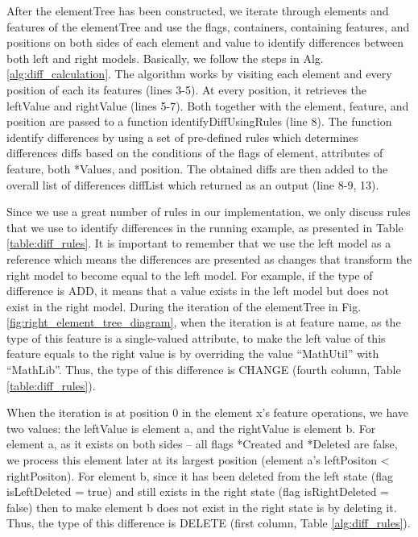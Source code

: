 \documentclass{jot}
\begin{document}
After the \textsf{elementTree} has been constructed, we iterate through elements and features of the \textsf{elementTree} and use the flags, containers, containing features, and positions on both sides of each element and value to identify differences between both left and right models. Basically, we follow the steps in Alg. \ref{alg:diff_calculation}. The algorithm works by visiting each element and every position of each its features (lines 3-5). At every position, it retrieves the \textsf{leftValue} and \textsf{rightValue} (lines 5-7).  Both together with the \textsf{element}, \textsf{feature}, and \textsf{position} are passed to a function \textsf{identifyDiffUsingRules} (line 8). The function identify differences by using a set of pre-defined rules which determines differences \textsf{diffs} based on the conditions of the flags of \textsf{element}, attributes of \textsf{feature}, both \textsf{*Values}, and \textsf{position}. The obtained \textsf{diffs} are then added to the overall list of differences \textsf{diffList} which returned as an output (line 8-9, 13). 

Since we use a great number of rules in our implementation, we only discuss rules that we use to identify differences in the running example, as presented in Table \ref{table:diff_rules}. It is important to remember that we use the left model as a reference which means the differences are presented as changes that transform the right model to become equal to the left model. For example, if the type of difference is \textsf{ADD}, it means that a value exists in the left model but does not exist in the right model. During the iteration of the \textsf{elementTree} in Fig. \ref{fig:right_element_tree_diagram}, when the iteration is at feature \textsf{name}, as the type of this feature is a single-valued attribute, to make the left value of this feature equals to the right value is by overriding the value ``MathUtil'' with ``MathLib''. Thus, the type of this difference is \textsf{CHANGE} (fourth column, Table \ref{table:diff_rules}).

When the iteration is at position 0 in the element \textsf{x}'s feature \textsf{operations}, we have two values: the \textsf{leftValue} is element \textsf{a}, and the \textsf{rightValue} is element \textsf{b}. For element \textsf{a}, as it exists on both sides -- all flags \textsf{*Created} and \textsf{*Deleted} are false, we process this element later at its largest position (element \textsf{a}'s \textsf{leftPositon} < \textsf{rightPositon}). For element \textsf{b}, since it has been deleted from the left state (flag \textsf{isLeftDeleted} = true) and still exists in the right state (flag \textsf{isRightDeleted} = false) then to make element \textsf{b} does not exist in the right state is by deleting it. Thus, the type of this difference is \textsf{DELETE} (first column, Table \ref{alg:diff_rules}).
\end{document}
